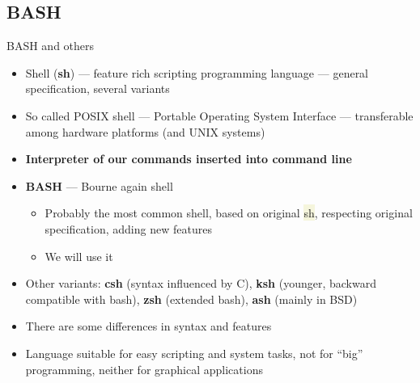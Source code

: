 \documentclass[compress, ucs, xelatex, 11pt, xcolor=svgnames, aspectratio=169,
	hyperref={
		bookmarks=true,
		unicode=true,
		colorlinks=true,
		pdftitle={Linux, command line and MetaCentrum},
		plainpages=false,
		pdfauthor={Vojtech Zeisek},
		pdfsubject={Course about use of Linux command line, writing shell scripts and using MetaCentrum of CESNET},
		pdfcreator={XeLaTeX},
		pdfkeywords={Linux, GNU, BASH, shell, command line, MetaCentrum},
		linkcolor=DarkRed, %
		anchorcolor=DarkBlue, %
		citecolor=Indigo, %
		filecolor=NavyBlue, %
		menucolor=DarkMagenta, %
		urlcolor=DarkBlue, %
		pdftex},
	url={hyphens, lowtilde} %
	]{beamer}
\renewcommand{\texttt}[1]{\colorbox{Beige}{{\ttfamily #1}}}
\begin{document}
\subsection{BASH}

\begin{frame}{BASH and others}
	\begin{itemize}
		\item Shell (\textbf{sh}) --- feature rich scripting programming language --- general specification, several variants
		\item So called POSIX shell --- Portable Operating System Interface --- transferable among hardware platforms (and UNIX systems)
		\item \textbf{Interpreter of our commands inserted into command line}
		\item \textbf{BASH} --- Bourne again shell
		\begin{itemize}
			\item Probably the most common shell, based on original \texttt{sh}, respecting original specification, adding new features
			\item We will use it
		\end{itemize}
		\item Other variants: \textbf{csh} (syntax influenced by C), \textbf{ksh} (younger, backward compatible with bash), \textbf{zsh} (extended bash), \textbf{ash} (mainly in BSD)
		\item There are some differences in syntax and features
		\item Language suitable for easy scripting and system tasks, not for \enquote{big} programming, neither for graphical applications
	\end{itemize}
\end{frame}
\end{document}
